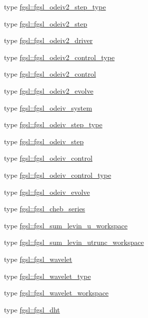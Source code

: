 \begin{DoxyCompactItemize}
type \hyperlink{structfgsl_1_1fgsl__odeiv2__step__type}{fgsl\+::fgsl\+\_\+odeiv2\+\_\+step\+\_\+type}
\item 
type \hyperlink{structfgsl_1_1fgsl__odeiv2__step}{fgsl\+::fgsl\+\_\+odeiv2\+\_\+step}
\item 
type \hyperlink{structfgsl_1_1fgsl__odeiv2__driver}{fgsl\+::fgsl\+\_\+odeiv2\+\_\+driver}
\item 
type \hyperlink{structfgsl_1_1fgsl__odeiv2__control__type}{fgsl\+::fgsl\+\_\+odeiv2\+\_\+control\+\_\+type}
\item 
type \hyperlink{structfgsl_1_1fgsl__odeiv2__control}{fgsl\+::fgsl\+\_\+odeiv2\+\_\+control}
\item 
type \hyperlink{structfgsl_1_1fgsl__odeiv2__evolve}{fgsl\+::fgsl\+\_\+odeiv2\+\_\+evolve}
\item 
type \hyperlink{structfgsl_1_1fgsl__odeiv__system}{fgsl\+::fgsl\+\_\+odeiv\+\_\+system}
\item 
type \hyperlink{structfgsl_1_1fgsl__odeiv__step__type}{fgsl\+::fgsl\+\_\+odeiv\+\_\+step\+\_\+type}
\item 
type \hyperlink{structfgsl_1_1fgsl__odeiv__step}{fgsl\+::fgsl\+\_\+odeiv\+\_\+step}
\item 
type \hyperlink{structfgsl_1_1fgsl__odeiv__control}{fgsl\+::fgsl\+\_\+odeiv\+\_\+control}
\item 
type \hyperlink{structfgsl_1_1fgsl__odeiv__control__type}{fgsl\+::fgsl\+\_\+odeiv\+\_\+control\+\_\+type}
\item 
type \hyperlink{structfgsl_1_1fgsl__odeiv__evolve}{fgsl\+::fgsl\+\_\+odeiv\+\_\+evolve}
\item 
type \hyperlink{structfgsl_1_1fgsl__cheb__series}{fgsl\+::fgsl\+\_\+cheb\+\_\+series}
\item 
type \hyperlink{structfgsl_1_1fgsl__sum__levin__u__workspace}{fgsl\+::fgsl\+\_\+sum\+\_\+levin\+\_\+u\+\_\+workspace}
\item 
type \hyperlink{structfgsl_1_1fgsl__sum__levin__utrunc__workspace}{fgsl\+::fgsl\+\_\+sum\+\_\+levin\+\_\+utrunc\+\_\+workspace}
\item 
type \hyperlink{structfgsl_1_1fgsl__wavelet}{fgsl\+::fgsl\+\_\+wavelet}
\item 
type \hyperlink{structfgsl_1_1fgsl__wavelet__type}{fgsl\+::fgsl\+\_\+wavelet\+\_\+type}
\item 
type \hyperlink{structfgsl_1_1fgsl__wavelet__workspace}{fgsl\+::fgsl\+\_\+wavelet\+\_\+workspace}
\item 
type \hyperlink{structfgsl_1_1fgsl__dht}{fgsl\+::fgsl\+\_\+dht}

\end{DoxyCompactItemize}
